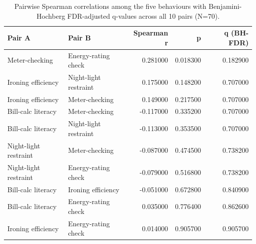 \begin{table}
\caption{Pairwise Spearman correlations among the five behaviours with Benjamini-Hochberg FDR-adjusted q-values across all 10 pairs (N=70).}
\label{tab:05_interitem_pairs_fdr}
\begin{tabular}{llrrr}
\toprule
Pair A & Pair B & Spearman r & p & q (BH-FDR) \\
\midrule
Meter-checking & Energy-rating check & 0.281000 & 0.018300 & 0.182900 \\
Ironing efficiency & Night-light restraint & 0.175000 & 0.148200 & 0.707000 \\
Ironing efficiency & Meter-checking & 0.149000 & 0.217500 & 0.707000 \\
Bill-calc literacy & Meter-checking & -0.117000 & 0.335200 & 0.707000 \\
Bill-calc literacy & Night-light restraint & -0.113000 & 0.353500 & 0.707000 \\
Night-light restraint & Meter-checking & -0.087000 & 0.474500 & 0.738200 \\
Night-light restraint & Energy-rating check & -0.079000 & 0.516800 & 0.738200 \\
Bill-calc literacy & Ironing efficiency & -0.051000 & 0.672800 & 0.840900 \\
Bill-calc literacy & Energy-rating check & 0.035000 & 0.776400 & 0.862600 \\
Ironing efficiency & Energy-rating check & 0.014000 & 0.905700 & 0.905700 \\
\bottomrule
\end{tabular}
\end{table}
